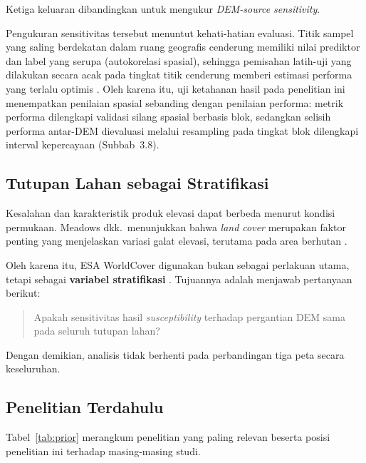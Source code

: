 \documentclass[12pt]{article}
\begin{document}
Ketiga keluaran dibandingkan untuk mengukur
\textit{DEM-source sensitivity}.

Pengukuran sensitivitas tersebut menuntut kehati-hatian evaluasi. Titik
sampel yang saling berdekatan dalam ruang geografis cenderung memiliki
nilai prediktor dan label yang serupa (autokorelasi spasial), sehingga
pemisahan latih-uji yang dilakukan secara acak pada tingkat titik
cenderung memberi estimasi performa yang terlalu optimis
\cite{roberts2017,ploton2020}. Oleh karena itu, uji ketahanan hasil pada
penelitian ini menempatkan penilaian spasial sebanding dengan penilaian
performa: metrik performa dilengkapi validasi silang spasial berbasis blok,
sedangkan selisih performa antar-DEM dievaluasi melalui resampling pada
tingkat blok dilengkapi interval kepercayaan (Subbab~3.8).

\subsection{Tutupan Lahan sebagai Stratifikasi}

Kesalahan dan karakteristik produk elevasi dapat berbeda menurut kondisi
permukaan. Meadows dkk.\ menunjukkan bahwa \textit{land cover} merupakan
faktor penting yang menjelaskan variasi galat elevasi, terutama pada area
berhutan \cite{meadows2024}.

Oleh karena itu, ESA WorldCover digunakan bukan sebagai perlakuan utama,
tetapi sebagai \textbf{variabel stratifikasi} \cite{zanaga2021}. Tujuannya
adalah menjawab pertanyaan berikut:

\begin{quote}
Apakah sensitivitas hasil \textit{susceptibility} terhadap pergantian DEM
sama pada seluruh tutupan lahan?
\end{quote}

Dengan demikian, analisis tidak berhenti pada perbandingan tiga peta secara
keseluruhan.

\subsection{Penelitian Terdahulu}

Tabel~\ref{tab:prior} merangkum penelitian yang paling relevan beserta
posisi penelitian ini terhadap masing-masing studi.
\end{document}
